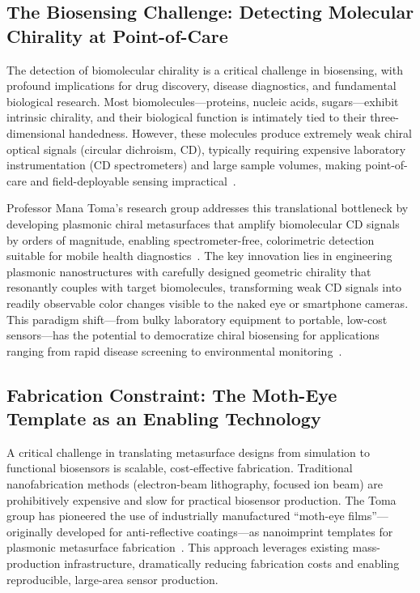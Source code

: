 \documentclass[12pt,a4paper]{article}
\begin{document}
\subsection{The Biosensing Challenge: Detecting Molecular Chirality at Point-of-Care}
The detection of biomolecular chirality is a critical challenge in biosensing, with profound implications for drug discovery, disease diagnostics, and fundamental biological research. Most biomolecules---proteins, nucleic acids, sugars---exhibit intrinsic chirality, and their biological function is intimately tied to their three-dimensional handedness. However, these molecules produce extremely weak chiral optical signals (circular dichroism, CD), typically requiring expensive laboratory instrumentation (CD spectrometers) and large sample volumes, making point-of-care and field-deployable sensing impractical~\cite{nanophotonic_biosensors_acs,nanophotonic_biosensors_review}.

Professor Mana Toma's research group addresses this translational bottleneck by developing plasmonic chiral metasurfaces that amplify biomolecular CD signals by orders of magnitude, enabling spectrometer-free, colorimetric detection suitable for mobile health diagnostics~\cite{toma_researches,toma_orcid}. The key innovation lies in engineering plasmonic nanostructures with carefully designed geometric chirality that resonantly couples with target biomolecules, transforming weak CD signals into readily observable color changes visible to the naked eye or smartphone cameras. This paradigm shift---from bulky laboratory equipment to portable, low-cost sensors---has the potential to democratize chiral biosensing for applications ranging from rapid disease screening to environmental monitoring~\cite{nanophotonic_biosensors_acs}.

\subsection{Fabrication Constraint: The Moth-Eye Template as an Enabling Technology}
A critical challenge in translating metasurface designs from simulation to functional biosensors is scalable, cost-effective fabrication. Traditional nanofabrication methods (electron-beam lithography, focused ion beam) are prohibitively expensive and slow for practical biosensor production. The Toma group has pioneered the use of industrially manufactured ``moth-eye films''---originally developed for anti-reflective coatings---as nanoimprint templates for plasmonic metasurface fabrication~\cite{motheye_nil_metasurface,nil_metasurface_review}. This approach leverages existing mass-production infrastructure, dramatically reducing fabrication costs and enabling reproducible, large-area sensor production.
\end{document}
